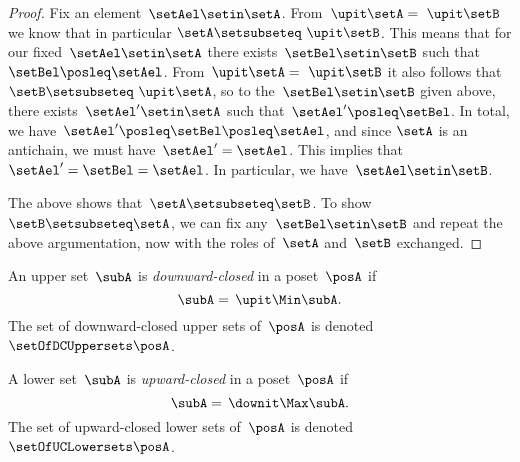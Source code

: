 \begin{proof}
    Fix an element~$\setAel \setin \setA$.
    From~$\upit  \setA = \ \upit  \setB$ we know that in particular $\setA \setsubseteq \ \upit  \setB$.
    This means that for our fixed~$\setAel \setin \setA$ there exists~$\setBel \setin \setB$ such that~$\setBel \posleq \setAel$.
    From~$\upit \setA = \ \upit  \setB$ it also follows that~$\setB \setsubseteq \ \upit  \setA$, so to the~$\setBel \setin \setB$ given above, there exists~$\setAel' \setin \setA$ such that~$\setAel' \posleq \setBel$.
    In total, we have~$\setAel' \posleq \setBel \posleq \setAel$, and since $\setA$ is an antichain, we must have~$\setAel' = \setAel$.
    This implies that~$\setAel' = \setBel = \setAel$.
    In particular, we have~$\setAel \setin \setB$.

    The above shows that~$\setA \setsubseteq \setB$.
    To show~$\setB \setsubseteq \setA$, we can fix any~$\setBel \setin \setB$ and repeat the above argumentation, now with the roles of~$\setA$ and~$\setB$ exchanged.
\end{proof}

\begin{definition}
    \label{def:downward-closed-upperset}
    An upper set~$\subA$ is \emph{downward-closed} in a poset~$\posA$ if
    \begin{equation}
        \subA =\, \upit  \Min \subA.
    \end{equation}
    The set of downward-closed upper sets of~$\posA$ is denoted~$\setOfDCUppersets \posA$.

\end{definition}

\begin{definition}
    \label{def:upward-closed-lowerset}
    A lower set~$\subA$ is \emph{upward-closed} in a poset~$\posA$ if
    \begin{equation}
        \subA =\, \downit  \Max \subA.
    \end{equation}
    The set of upward-closed lower sets of~$\posA$ is denoted~$\setOfUCLowersets \posA$.
\end{definition}
